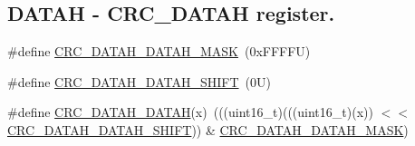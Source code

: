 \subsection*{D\+A\+T\+AH -\/ C\+R\+C\+\_\+\+D\+A\+T\+AH register.}
\begin{DoxyCompactItemize}
\item 
\#define \mbox{\hyperlink{group___c_r_c___register___masks_ga8d8b84bf7b81a4943bfe4d92eea7a83d}{C\+R\+C\+\_\+\+D\+A\+T\+A\+H\+\_\+\+D\+A\+T\+A\+H\+\_\+\+M\+A\+SK}}~(0x\+F\+F\+F\+F\+U)
\item 
\#define \mbox{\hyperlink{group___c_r_c___register___masks_ga2820b1c312342051ef13af454924dd6a}{C\+R\+C\+\_\+\+D\+A\+T\+A\+H\+\_\+\+D\+A\+T\+A\+H\+\_\+\+S\+H\+I\+FT}}~(0\+U)
\item 
\#define \mbox{\hyperlink{group___c_r_c___register___masks_ga1a935b7a0739c9353ea1db915d15098f}{C\+R\+C\+\_\+\+D\+A\+T\+A\+H\+\_\+\+D\+A\+T\+AH}}(x)~(((uint16\+\_\+t)(((uint16\+\_\+t)(x)) $<$$<$ \mbox{\hyperlink{group___c_r_c___register___masks_ga2820b1c312342051ef13af454924dd6a}{C\+R\+C\+\_\+\+D\+A\+T\+A\+H\+\_\+\+D\+A\+T\+A\+H\+\_\+\+S\+H\+I\+FT}})) \& \mbox{\hyperlink{group___c_r_c___register___masks_ga8d8b84bf7b81a4943bfe4d92eea7a83d}{C\+R\+C\+\_\+\+D\+A\+T\+A\+H\+\_\+\+D\+A\+T\+A\+H\+\_\+\+M\+A\+SK}})
\end{DoxyCompactItemize}
